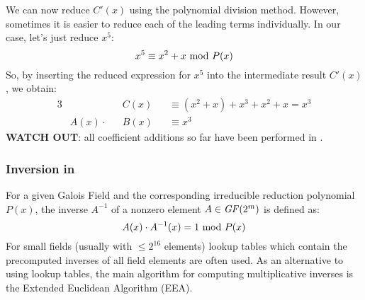 We can now reduce $C'(x)$ using the polynomial division method. However, sometimes it is easier to reduce each of the leading terms individually. In our case, let's just reduce $x^5$:
$$x^5\equiv x^2+x\text{ mod } P(x)$$
So, by inserting the reduced expression for $x^5$ into the intermediate result $C'(x)$, we obtain:
\begin{alignat*}{3}
    &         &&C(x)&&\equiv(x^2+x)+x^3+x^2+x=x^3\\
    &A(x)\cdot&&B(x)&&\equiv x^3
\end{alignat*}
\textbf{WATCH OUT}: all coefficient additions so far have been performed in .

\newpage
\subsubsection{Inversion in }
For a given Galois Field  and the corresponding irreducible reduction polynomial $P(x)$, the inverse $A^{-1}$ of a nonzero element $A\in\text{\textit{GF}($2^m$)}$ is defined as:
$$A(x)\cdot A^{-1}(x)=1\text{ mod } P(x)$$
For small fields (usually with $\le2^{16}$ elements) lookup tables which contain the precomputed inverses of all field elements are often used. As an alternative to using lookup tables, the main algorithm for computing multiplicative inverses is the Extended Euclidean Algorithm (EEA).

